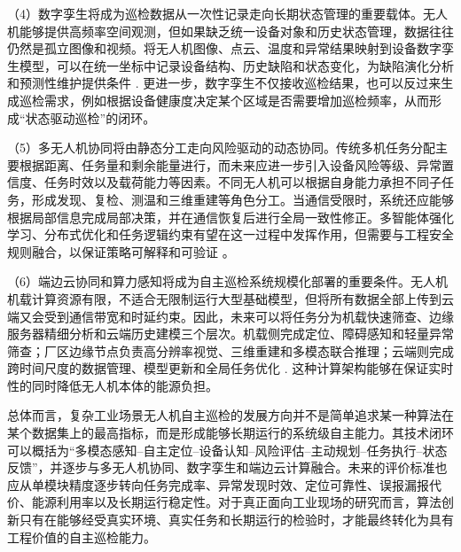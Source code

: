 （4）数字孪生将成为巡检数据从一次性记录走向长期状态管理的重要载体。无人机能够提供高频率空间观测，但如果缺乏统一设备对象和历史状态管理，数据往往仍然是孤立图像和视频。将无人机图像、点云、温度和异常结果映射到设备数字孪生模型，可以在统一坐标中记录设备结构、历史缺陷和状态变化，为缺陷演化分析和预测性维护提供条件
\cite{tao2019digital}. 更进一步，数字孪生不仅接收巡检结果，也可以反过来生成巡检需求，例如根据设备健康度决定某个区域是否需要增加巡检频率，从而形成“状态驱动巡检”的闭环。

（5）多无人机协同将由静态分工走向风险驱动的动态协同。传统多机任务分配主要根据距离、任务量和剩余能量进行，而未来应进一步引入设备风险等级、异常置信度、任务时效以及载荷能力等因素。不同无人机可以根据自身能力承担不同子任务，形成发现、复检、测温和三维重建等角色分工。当通信受限时，系统还应能够根据局部信息完成局部决策，并在通信恢复后进行全局一致性修正。多智能体强化学习、分布式优化和任务逻辑约束有望在这一过程中发挥作用，但需要与工程安全规则融合，以保证策略可解释和可验证
\cite{yu2022surprising,zhou2023racer}。

（6）端边云协同和算力感知将成为自主巡检系统规模化部署的重要条件。无人机机载计算资源有限，不适合无限制运行大型基础模型，但将所有数据全部上传到云端又会受到通信带宽和时延约束。因此，未来可以将任务分为机载快速筛查、边缘服务器精细分析和云端历史建模三个层次。机载侧完成定位、障碍感知和轻量异常筛查；厂区边缘节点负责高分辨率视觉、三维重建和多模态联合推理；云端则完成跨时间尺度的数据管理、模型更新和全局任务优化
\cite{zhou2018computation,mozaffari2019tutorial}. 这种计算架构能够在保证实时性的同时降低无人机本体的能源负担。

总体而言，复杂工业场景无人机自主巡检的发展方向并不是简单追求某一种算法在某个数据集上的最高指标，而是形成能够长期运行的系统级自主能力。其技术闭环可以概括为“多模态感知--自主定位--设备认知--风险评估--主动规划--任务执行--状态反馈”，并逐步与多无人机协同、数字孪生和端边云计算融合。未来的评价标准也应从单模块精度逐步转向任务完成率、异常发现时效、定位可靠性、误报漏报代价、能源利用率以及长期运行稳定性。对于真正面向工业现场的研究而言，算法创新只有在能够经受真实环境、真实任务和长期运行的检验时，才能最终转化为具有工程价值的自主巡检能力。

